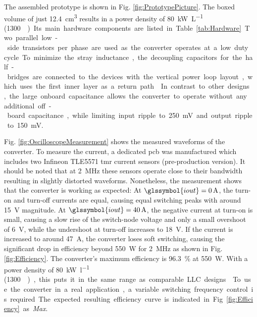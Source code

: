 \documentclass{IPEC2026TEC}
\newcommand{\sbl}[1]{\glssymbol{#1}}
\newcommand{\ac}{\gls}
\begin{document}

The assembled prototype is shown in Fig. \ref{fig:PrototypePicture}. The boxed volume of just \qty{12.4}{\cubic\cm} results in a power density of \qty{80}{\kW\per\liter} (\qty{1300}{\W\per\cubic\inch}). Its main hardware components are listed in Table \ref{tab:Hardware}. Two parallel low-side transistors per phase are used as the converter operates at a low duty cycle. To minimize the stray inductance, the decoupling capacitors for the half-bridges are connected to the devices with the vertical power loop layout, which uses the first inner layer as a return path \cite{reuschUnderstandingEffectPCB2014}. In contrast to other designs, the large onboard capacitance allows the converter to operate without any additional off-board capacitance, while limiting input ripple to \qty{250}{\mV} and output ripple to \qty{150}{\mV}. \par
Fig. \ref{fig:OscilloscopeMeasurement} shows the measured waveforms of the converter. To measure the current, a dedicated \ac{pcb} was manufactured which includes two Infineon TLE5571 \ac{tmr} current sensors (pre-production version). It should be noted that at \qty{2}{\MHz} these sensors operate close to their bandwidth resulting in slightly distorted waveforms. Nonetheless, the measurement shows that the converter is working as expected: At $\sbl{iout}=\qty{0}{\A}$, the turn-on and turn-off currents are equal, causing equal switching peaks with around \qty{15}{\V} magnitude. At $\sbl{iout}=\qty{40}{\A}$, the negative current at turn-on is small, causing a slow rise of the switch-node voltage and only a small overshoot of \qty{6}{\V}, while the undershoot at turn-off increases to \qty{18}{\V}. If the current is increased to around \qty{47}{\A}, the converter loses soft switching, causing the significant drop in efficiency beyond \qty{550}{\W} for \qty{2}{\MHz} as shown in Fig. \ref{fig:Efficiency}. The converter's maximum efficiency is \qty{96.3}{\percent} at \qty{550}{\W}. With a power density of \qty{80}{\kW\per\l} (\qty{1300}{\W\per\cubic\inch}), this puts it in the same range as comparable LLC designs %
\cite{caiOptimalDesignMegahertz2020, flexpowerBMR480SeriesDCDC2019,ahmedLowLossIntegratedInductor2020}
To use the converter in a real application, a variable switching frequency control is required. The expected resulting efficiency curve is indicated in Fig. \ref{fig:Efficiency} as \textit{Max}.
\end{document}
